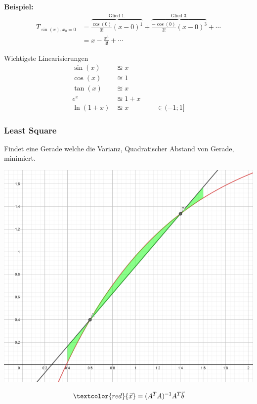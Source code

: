 \noindent\textbf{Beispiel:}
\begin{align*}
	T_{\sin(x), x_0 = 0} &= \overbrace{\frac{\cos(0)}{0!}(x - 0)^1}^{\text{Glied 1.}} + \overbrace{\frac{-\cos(0)}{3!}(x - 0)^3}^{\text{Glied 3.}} + \cdots \\
	&= x - \frac{x^3}{3!} + \cdots
\end{align*}

\noindent Wichtigste Linearisierungen
\begin{align*}
	\sin(x) &\approxeq x \\
	\cos(x) &\approxeq 1 \\
	\tan(x) &\approxeq x \\
	e^x &\approxeq 1 + x \\
	\ln(1 + x) &\approxeq x \qquad\qquad\in(-1;1]
\end{align*}


\subsubsection{Least Square}
Findet eine Gerade welche die Varianz, Quadratischer Abstand von Gerade, minimiert. 
\begin{center}
	\begin{minipage}{0.20\textwidth}
		\begin{center}
			\includegraphics[width=\linewidth,keepaspectratio=true]{Images/leastsquare}\\
		\end{center}
	\end{minipage}%
	\begin{minipage}{0.3\textwidth}
		\[\textcolor{red}{\vec{x}} = (A^TA)^{-1}A^T\vec{b}\]
	\end{minipage}
\end{center}

